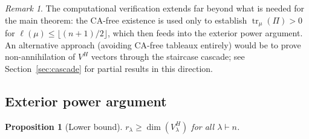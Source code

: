 \documentclass[11pt]{article}
\newtheorem{proposition}[theorem]{Proposition}
\theoremstyle{definition}
\theoremstyle{remark}
\newtheorem{remark}[theorem]{Remark}
\DeclareMathOperator{\tr}{tr}
\begin{document}
\begin{remark}
The computational verification extends far beyond what is needed for
the main theorem: the CA-free existence is used only to establish
$\tr_\mu(\Pi) > 0$ for $\ell(\mu) \le \lfloor(n+1)/2\rfloor$,
which then feeds into the exterior power argument. An alternative
approach (avoiding CA-free tableaux entirely) would be to prove
non-annihilation of $V^H$ vectors through the staircase cascade;
see Section~\ref{sec:cascade} for partial results in this direction.
\end{remark}

\subsection{Exterior power argument}

\begin{proposition}[Lower bound]\label{prop:lower}
$r_\lambda \ge \dim(V_\lambda^H)$ for all $\lambda \vdash n$.
\end{proposition}
\end{document}
